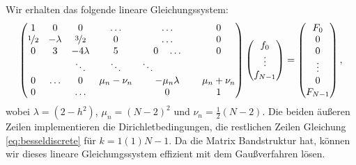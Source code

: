 Wir erhalten das folgende lineare Gleichungssystem:
\begin{equation}
  \begin{pmatrix}
    1 & 0         & 0         &\ldots & \ldots & 0\\
    \nicefrac{1}{2} & -\lambda & \nicefrac{3}{2} & 0 & \ldots & 0\\
    0 & 3         & -4\lambda & 5 & 0\quad \ldots & 0\\
    & & \ddots & \ddots & \ddots\qquad\qquad \\
    0 & \ldots & 0 & \mu_n - \nu_n & -\mu_n\lambda & \mu_n + \nu_n\\
    0 &          &  \ldots  &   & 0      & 1
  \end{pmatrix}
  \begin{pmatrix}
    f_0\\
    \vdots\\
    f_{N-1}
  \end{pmatrix}=
  \begin{pmatrix}
    F_0\\
    0\\
    0\\
    \vdots\\
    0 \\
    F_{N-1}
  \end{pmatrix},
\end{equation}
wobei $\lambda=(2-h^2)$, $\mu_n=(N-2)^2$ und $\nu_n=
\frac{1}{2}(N-2)$. Die beiden äußeren Zeilen implementieren die
Dirichletbedingungen, die restlichen Zeilen Gleichung
\eqref{eq:besseldiscrete} für $k=1(1)N-1$.  Da die Matrix Bandstruktur
hat, können wir dieses lineare Gleichungssystem effizient mit dem
Gaußverfahren lösen.

